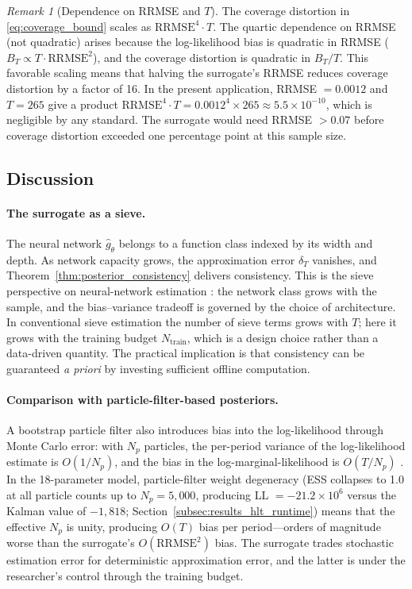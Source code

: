 \documentclass[12pt]{article}
\theoremstyle{plain}
\theoremstyle{definition}
\theoremstyle{remark}
\newtheorem{remark}[theorem]{Remark}
\begin{document}
\begin{remark}[Dependence on RRMSE and $T$]
\label{rem:rrmse_scaling}
The coverage distortion in \eqref{eq:coverage_bound} scales as $\text{RRMSE}^4 \cdot T$. The quartic dependence on RRMSE (not quadratic) arises because the log-likelihood bias is quadratic in RRMSE ($B_T \propto T \cdot \text{RRMSE}^2$), and the coverage distortion is quadratic in $B_T/T$. This favorable scaling means that halving the surrogate's RRMSE reduces coverage distortion by a factor of 16. In the present application, RRMSE $= 0.0012$ and $T = 265$ give a product $\text{RRMSE}^4 \cdot T = 0.0012^4 \times 265 \approx 5.5 \times 10^{-10}$, which is negligible by any standard. The surrogate would need RRMSE $> 0.07$ before coverage distortion exceeded one percentage point at this sample size.
\end{remark}

\subsection{Discussion}

\paragraph{The surrogate as a sieve.}
The neural network $\hat{g}_\theta$ belongs to a function class indexed by its width and depth. As network capacity grows, the approximation error $\delta_T$ vanishes, and Theorem~\ref{thm:posterior_consistency} delivers consistency. This is the sieve perspective on neural-network estimation \citep{chen2007large}: the network class grows with the sample, and the bias--variance tradeoff is governed by the choice of architecture. In conventional sieve estimation the number of sieve terms grows with $T$; here it grows with the training budget $N_{\text{train}}$, which is a design choice rather than a data-driven quantity. The practical implication is that consistency can be guaranteed \emph{a priori} by investing sufficient offline computation.

\paragraph{Comparison with particle-filter-based posteriors.}
A bootstrap particle filter also introduces bias into the log-likelihood through Monte Carlo error: with $N_p$ particles, the per-period variance of the log-likelihood estimate is $O(1/N_p)$, and the bias in the log-marginal-likelihood is $O(T/N_p)$ \citep{pitt2012some,doucet2015efficient}. In the 18-parameter model, particle-filter weight degeneracy (ESS collapses to 1.0 at all particle counts up to $N_p = 5{,}000$, producing LL $= -21.2 \times 10^6$ versus the Kalman value of $-1{,}818$; Section~\ref{subsec:results_hlt_runtime}) means that the effective $N_p$ is unity, producing $O(T)$ bias per period---orders of magnitude worse than the surrogate's $O(\text{RRMSE}^2)$ bias. The surrogate trades stochastic estimation error for deterministic approximation error, and the latter is under the researcher's control through the training budget.
\end{document}
